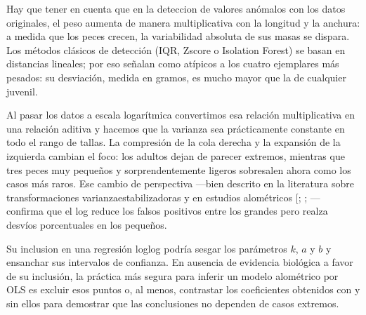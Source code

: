 \documentclass[a4paper,10pt,spanish]{jupyterBook}
\begin{document}
\sphinxAtStartPar
Hay que tener en cuenta que en la deteccion de valores anómalos con los datos originales, el peso aumenta de manera multiplicativa con la longitud y la anchura: a medida que los peces crecen, la variabilidad absoluta de sus masas se dispara. Los métodos clásicos de detección (IQR, Z\sphinxhyphen{}score o Isolation Forest) se basan en distancias lineales; por eso señalan como atípicos a los cuatro ejemplares más pesados: su desviación, medida en gramos, es mucho mayor que la de cualquier juvenil.

\sphinxAtStartPar
Al pasar los datos a escala logarítmica convertimos esa relación multiplicativa en una relación aditiva y hacemos que la varianza sea prácticamente constante en todo el rango de tallas. La compresión de la cola derecha y la expansión de la izquierda cambian el foco: los adultos dejan de parecer extremos, mientras que tres peces muy pequeños y sorprendentemente ligeros sobresalen ahora como los casos más raros. Ese cambio de perspectiva —bien descrito en la literatura sobre transformaciones varianza\sphinxhyphen{}estabilizadoras 
y en estudios alométricos {[}; ; \sphinxhref{https://doi.org/10.1111/j.1439-0426.2003.00480.x}{Borges et al., 2003}{]}— confirma que el log reduce los falsos positivos entre los grandes pero realza desvíos porcentuales en los pequeños.

\sphinxAtStartPar
{}

\sphinxAtStartPar
Su inclusion en una regresión log\sphinxhyphen{}log podría sesgar los parámetros \(k\), \(a\) y \(b\) y ensanchar sus intervalos de confianza. En ausencia de evidencia biológica a favor de su inclusión, la práctica más segura para inferir un modelo alométrico por OLS es excluir esos puntos o, al menos, contrastar los coeficientes obtenidos con y sin ellos para demostrar que las conclusiones no dependen de casos extremos.

\sphinxstepscope
\end{document}

